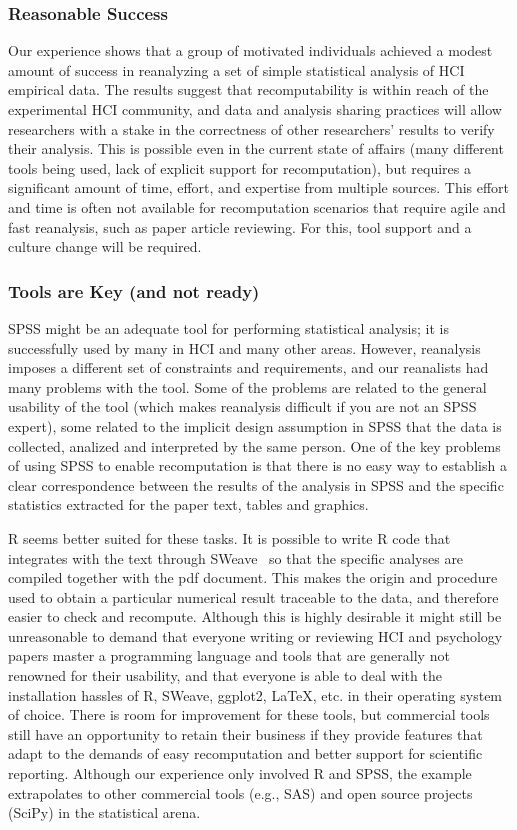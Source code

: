 \subsubsection{Reasonable Success}
Our experience shows that a group of motivated individuals achieved a modest amount of success in reanalyzing a set of simple statistical analysis of HCI empirical data. The results suggest that recomputability is within reach of the experimental HCI community, and data and analysis sharing practices will allow researchers with a stake in the correctness of other researchers' results to verify their analysis. This is possible even in the current state of affairs (many different tools being used, lack of explicit support for recomputation), but requires a significant amount of time, effort, and expertise from multiple sources. This effort and time is often not available for recomputation scenarios that require agile and fast reanalysis, such as paper article reviewing. For this, tool support and a culture change will be required. 

\subsubsection{Tools are Key (and not ready)}
SPSS might be an adequate tool for performing statistical analysis; it is successfully used by many in HCI and many other areas. However, reanalysis imposes a different set of constraints and requirements, and our reanalists had many problems with the tool. Some of the problems are related to the general usability of the tool (which makes reanalysis difficult if you are not an SPSS expert), some related to the implicit design assumption in SPSS that the data is collected, analized and interpreted by the same person. One of the key problems of using SPSS to enable recomputation is that there is no easy way to establish a clear correspondence between the results of the analysis in SPSS and the specific statistics extracted for the paper text, tables and graphics. 

R seems better suited for these tasks. It is possible to write R code that integrates with the text through SWeave~\cite{lmucs-papers:Leisch:2002} so that the specific analyses are compiled together with the pdf document. This makes the origin and procedure used to obtain a particular numerical result traceable to the data, and therefore easier to check and recompute. Although this is highly desirable it might still be unreasonable to demand that everyone writing or reviewing HCI and psychology papers master a programming language and tools that are generally not renowned for their usability, and that everyone is able to deal with the installation hassles of R, SWeave, ggplot2, LaTeX, etc. in their operating system of choice. There is room for improvement for these tools, but commercial tools still have an opportunity to retain their business if they provide features that adapt to the demands of easy recomputation and better support for scientific reporting. Although our experience only involved R and SPSS, the example extrapolates to other commercial tools (e.g., SAS) and open source projects (SciPy) in the statistical arena.


